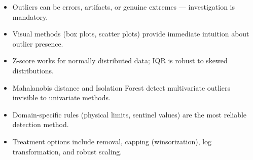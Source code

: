 \begin{itemize}
  \item Outliers can be errors, artifacts, or genuine extremes --- investigation is mandatory.
  \item Visual methods (box plots, scatter plots) provide immediate intuition about outlier presence.
  \item Z-score works for normally distributed data; IQR is robust to skewed distributions.
  \item Mahalanobis distance and Isolation Forest detect multivariate outliers invisible to univariate methods.
  \item Domain-specific rules (physical limits, sentinel values) are the most reliable detection method.
  \item Treatment options include removal, capping (winsorization), log transformation, and robust scaling.
\end{itemize}
